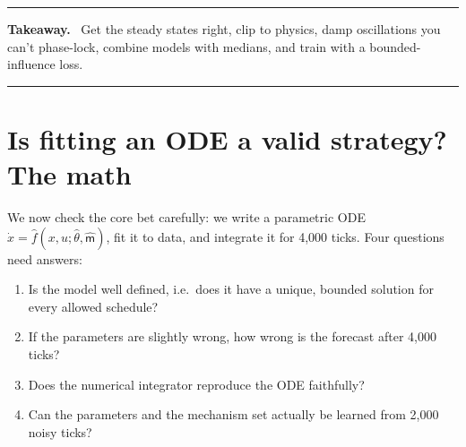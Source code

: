 \documentclass[11pt]{article}
\theoremstyle{plain}
\theoremstyle{definition}
\theoremstyle{remark}
\newenvironment{takeaway}{\par\medskip\noindent\begin{minipage}{\linewidth}\hrule\smallskip\noindent\textbf{Takeaway.}~}{\par\smallskip\hrule\end{minipage}\par\medskip}
\begin{document}
\begin{takeaway}
Get the steady states right, clip to physics, damp oscillations you can't phase-lock, combine models with medians, and train with a bounded-influence loss.
\end{takeaway}

\section{Is fitting an ODE a valid strategy? The math}\label{sec:validity}

We now check the core bet carefully: we write a parametric ODE $\dot x=\hat f(x,u;\hat\theta,\hat{\mathsf m})$, fit it to data, and integrate it for 4,000 ticks. Four questions need answers:
\begin{enumerate}[label=(Q\arabic*)]
\item Is the model well defined, i.e.\ does it have a unique, bounded solution for every allowed schedule?
\item If the parameters are slightly wrong, how wrong is the forecast after 4,000 ticks?
\item Does the numerical integrator reproduce the ODE faithfully?
\item Can the parameters and the mechanism set actually be learned from 2,000 noisy ticks?
\end{enumerate}
\end{document}
